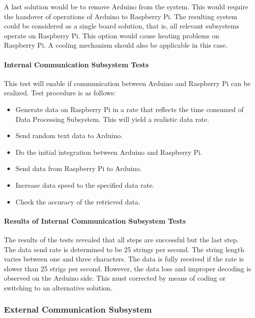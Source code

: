 \documentclass[a4paper,12pt]{article}
\begin{document}
		A last solution would be to remove Arduino from the system. This would require the handover of operations of Arduino to Raspberry Pi. The resulting system could be considered as a single board solution, that is, all relevant subsystems operate on Raspberry Pi. This option would cause heating problems on Raspberry Pi. A cooling mechanism should also be applicable in this case.
	\paragraph{Internal Communication Subsystem Tests}
	This test will enable if communication between Arduino and Raspberry Pi can be realized. Test procedure is as follows:
	\begin{itemize}
		\item Generate data on Raspberry Pi in a rate that reflects the time consumed of Data Processing Subsystem. This will yield a realistic data rate. \vspace{-0.2cm}
		\item Send random text data to Arduino. \vspace{-0.2cm}
		\item Do the initial integration between Arduino and Raspberry Pi. \vspace{-0.2cm}
		\item Send data from Raspberry Pi to Arduino. \vspace{-0.2cm}
		\item Increase data speed to the specified data rate. \vspace{-0.2cm}
		\item Check the accuracy of the retrieved data.\vspace{-0.2cm}
	\end{itemize}
	
	\paragraph{Results of Internal Communication Subsystem Tests}
	The results of the tests revealed that all steps are successful but the last step. The data send rate is determined to be 25 strings per second. The string length varies between one and three characters. The data is fully received if the rate is slower than 25 strigs per second. However, the data loss  and  improper decoding is observed on the Arduino side. This must corrected by means of coding or switching to an alternative solution.
	
	\subsubsection{External Communication Subsystem}
	
\end{document}
